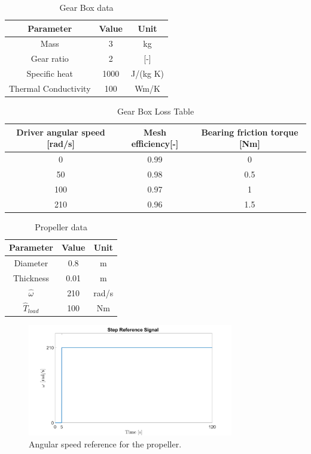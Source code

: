\documentclass[11pt,a4paper,oneside]{article}
\begin{document}
\begin{table}[ht!]
    \centering
    \caption{Gear Box data}
    \begin{tabular}{ |c|c|c| } 
        \hline
        \textbf{Parameter} & \textbf{Value} & \textbf{Unit}\\
        \hline
        Mass & 3 & kg  \\ 
        Gear ratio & 2 & [-]  \\ 
        Specific heat & 1000 & J/(kg K)   \\ 
        Thermal Conductivity & 100 & Wm/K \\ 
        \hline
    \end{tabular}
    \label{tab:gear}
\end{table}
        
\begin{table}[ht!]
    \centering
    \caption{Gear Box Loss Table}
    \begin{tabular}{ |c|c|c| } 
        \hline
        \textbf{Driver angular speed [rad/s]} & \textbf{Mesh efficiency[-]} & \textbf{Bearing friction torque [Nm]}\\
        \hline
        0 & 0.99 & 0  \\ 
        50 & 0.98 & 0.5  \\ 
        100 & 0.97 & 1  \\ 
        210 & 0.96 & 1.5  \\ 
        \hline
    \end{tabular}
    \label{tab:gear2}
\end{table}

\begin{table}[ht!]
    \centering
    \caption{Propeller data}
    \begin{tabular}{ |c|c|c| } 
        \hline
        \textbf{Parameter} & \textbf{Value} & \textbf{Unit}\\
        \hline
        Diameter & 0.8 & m  \\ 
        Thickness & 0.01 & m  \\ 
        $\hat{\omega}$ & 210 & rad/s \\
        $\hat{T}_{load}$ & 100 & Nm \\
        \hline
    \end{tabular}
    \label{tab:prop}
\end{table}

\begin{figure}[ht!]
    \centering
    \includegraphics[width=0.8\textwidth]{Figures/ReferenceSignal.png}
    \caption{\label{fig:refsignal} Angular speed reference for the propeller.}
\end{figure}
\end{document}

